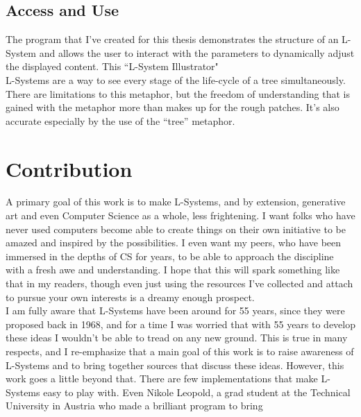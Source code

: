 \documentclass[12pt,twoside]{reedthesis}
\begin{document}
\section{Access and Use}


The program that I've created for this thesis demonstrates the structure of an L-System and allows the user to interact with the parameters to dynamically adjust the displayed content. This ``L-System Illustrator"\\


L-Systems are a way to see every stage of the life-cycle of a tree simultaneously. There are limitations to this metaphor, but the freedom of understanding that is gained with the metaphor more than makes up for the rough patches. It’s also accurate especially by the use of the “tree” metaphor. 



\chapter{Contribution}
	A primary goal of this work is to make L-Systems, and by extension, generative art and even Computer Science as a whole, less frightening. I want folks who have never used computers become able to create things on their own initiative to be amazed and inspired by the possibilities. I even want my peers, who have been immersed in the depths of CS for years, to be able to approach the discipline with a fresh awe and understanding. %
	I hope that this will spark something like that in my readers, though even just using the resources I’ve collected and attach to pursue your own interests is a dreamy enough prospect.\\
	
	I am fully aware that L-Systems have been around for 55 years, since they were proposed back in 1968, and for a time I was worried that with 55 years to develop these ideas I wouldn't be able to tread on any new ground. This is true in many respects, and I re-emphasize that a main goal of this work is to raise awareness of L-Systems and to bring together sources that discuss these ideas. However, this work goes a little beyond that. There are few implementations that make L-Systems easy to play with. Even Nikole Leopold, a grad student at the Technical University in Austria who made a brilliant program to bring\\
	
\end{document}
